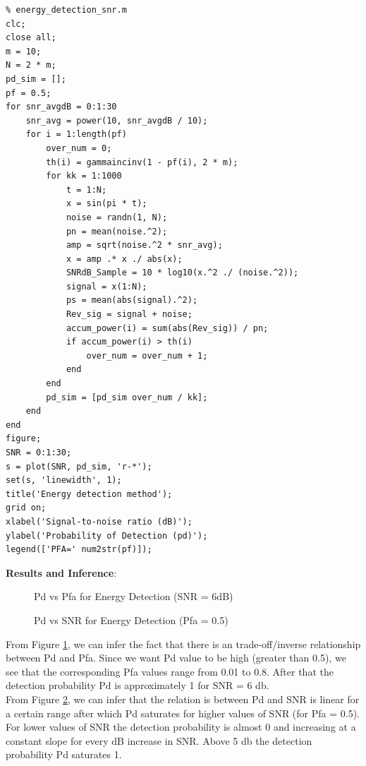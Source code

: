 \documentclass[a4paper]{article}
\begin{document}
\begin{verbatim}
% energy_detection_snr.m
clc;
close all;
m = 10;
N = 2 * m;
pd_sim = [];
pf = 0.5;
for snr_avgdB = 0:1:30
    snr_avg = power(10, snr_avgdB / 10);
    for i = 1:length(pf)
        over_num = 0;
        th(i) = gammaincinv(1 - pf(i), 2 * m);
        for kk = 1:1000
            t = 1:N;
            x = sin(pi * t);
            noise = randn(1, N);
            pn = mean(noise.^2);
            amp = sqrt(noise.^2 * snr_avg);
            x = amp .* x ./ abs(x);
            SNRdB_Sample = 10 * log10(x.^2 ./ (noise.^2));
            signal = x(1:N);
            ps = mean(abs(signal).^2);
            Rev_sig = signal + noise;
            accum_power(i) = sum(abs(Rev_sig)) / pn;
            if accum_power(i) > th(i)
                over_num = over_num + 1;
            end
        end
        pd_sim = [pd_sim over_num / kk];
    end
end
figure;
SNR = 0:1:30;
s = plot(SNR, pd_sim, 'r-*');
set(s, 'linewidth', 1);
title('Energy detection method');
grid on;
xlabel('Signal-to-noise ratio (dB)');
ylabel('Probability of Detection (pd)');
legend(['PFA=' num2str(pf)]);
\end{verbatim}
\textbf{\large{Results and Inference}}:\\[10pt]
\begin{figure}[h!bt]
  \centering
  
  \caption{Pd vs Pfa for Energy Detection (SNR = 6dB)}
  \label{fig:1.1}
\end{figure}
\begin{figure}[h!bt]
  \centering
  
  \caption{Pd vs SNR for Energy Detection (Pfa = 0.5)}
  \label{fig:1.2}
\end{figure}
From Figure \ref{fig:1.1}, we can infer the fact that there is an trade-off/inverse relationship between Pd and Pfa. Since we want Pd value to be high (greater than 0.5), we see that the corresponding Pfa values range from 0.01 to 0.8. After that the detection probability Pd is approximately 1 for SNR = 6 db.\\[8pt]
From Figure \ref{fig:1.2}, we can infer that the relation is between Pd and SNR is linear for a certain range after which Pd saturates for higher values of SNR (for Pfa = 0.5). For lower values of SNR the detection probability is almost 0 and increasing at a constant slope for every dB increase in SNR. Above 5 db the detection probability Pd saturates 1.\\
\end{document}
